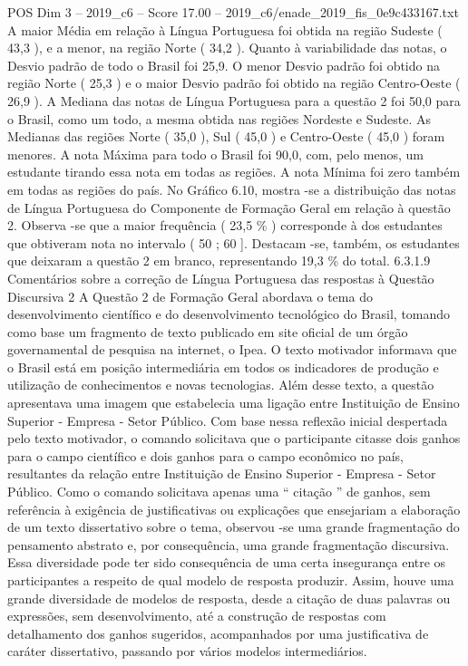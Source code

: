 \begin{textsample}{POS Dim 3 – 2019\_c6 – Score 17.00 – 2019\_c6/enade\_2019\_fis\_0e9c433167.txt}
A maior Média em relação à Língua Portuguesa foi obtida na região Sudeste ( 43,3 ), e a menor, na região Norte ( 34,2 ).
Quanto à variabilidade das notas, o Desvio padrão de todo o Brasil foi 25,9.
O menor Desvio padrão foi obtido na região Norte ( 25,3 ) e o maior Desvio padrão foi obtido na região Centro-Oeste ( 26,9 ).
A Mediana das notas de Língua Portuguesa para a questão 2 foi 50,0 para o Brasil, como um todo, a mesma obtida nas regiões Nordeste e Sudeste.
As Medianas das regiões Norte ( 35,0 ), Sul ( 45,0 ) e Centro-Oeste ( 45,0 ) foram menores.
A nota Máxima para todo o Brasil foi 90,0, com, pelo menos, um estudante tirando essa nota em todas as regiões.
A nota Mínima foi zero também em todas as regiões do país.
No Gráfico 6.10, mostra -se a distribuição das notas de Língua Portuguesa do Componente de Formação Geral em relação à questão 2.
Observa -se que a maior frequência ( 23,5 \% ) corresponde à dos estudantes que obtiveram nota no intervalo ( 50 ; 60 ].
Destacam -se, também, os estudantes que deixaram a questão 2 em branco, representando 19,3 \% do total. 6.3.1.9 Comentários sobre a correção de Língua Portuguesa das respostas à Questão Discursiva 2 A Questão 2 de Formação Geral abordava o tema do desenvolvimento científico e do desenvolvimento tecnológico do Brasil, tomando como base um fragmento de texto publicado em site oficial de um órgão governamental de pesquisa na internet, o Ipea.
O texto motivador informava que o Brasil está em posição intermediária em todos os indicadores de produção e utilização de conhecimentos e novas tecnologias.
Além desse texto, a questão apresentava uma imagem que estabelecia uma ligação entre Instituição de Ensino Superior - Empresa - Setor Público.
Com base nessa reflexão inicial despertada pelo texto motivador, o comando solicitava que o participante citasse dois ganhos para o campo científico e dois ganhos para o campo econômico no país, resultantes da relação entre Instituição de Ensino Superior - Empresa - Setor Público.
Como o comando solicitava apenas uma “ citação ” de ganhos, sem referência à exigência de justificativas ou explicações que ensejariam a elaboração de um texto dissertativo sobre o tema, observou -se uma grande fragmentação do pensamento abstrato e, por consequência, uma grande fragmentação discursiva.
Essa diversidade pode ter sido consequência de uma certa insegurança entre os participantes a respeito de qual modelo de resposta produzir.
Assim, houve uma grande diversidade de modelos de resposta, desde a citação de duas palavras ou expressões, sem desenvolvimento, até a construção de respostas com detalhamento dos ganhos sugeridos, acompanhados por uma justificativa de caráter dissertativo, passando por vários modelos intermediários.

\end{textsample}
